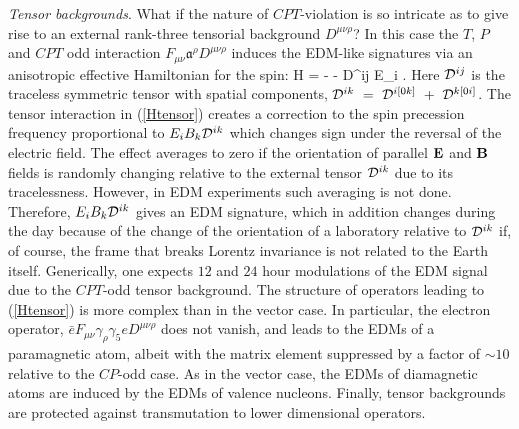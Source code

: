 \documentclass[prl,twocolumn,tightenlines,preprintnumbers,floatfix,nofootinbib]{revtex4}
\def\ba{\begin{eqnarray}}
\def\ea{\end{eqnarray}}
\begin{document}
{\em Tensor backgrounds}. What if the nature of $CPT$-violation is so intricate as to give rise to
an external rank-three tensorial background $D^{\mu\nu\rho}$?
 In this case the $T$, $P$ and $CPT$ odd interaction  
$F_{\mu\nu} \mathfrak{a}^{\rho}D^{\mu\nu\rho}$
induces the EDM-like signatures via an anisotropic effective Hamiltonian for the spin:
\be
H = -  \cdot {} - {\cal D}^{ij} E_i \cdot {}.
\label{Htensor}
\ee
Here ${\cal D}^{ij}$ is the traceless symmetric tensor with spatial components,
${\cal D}^{ik} ~=~ {\cal D}^{i[0k]} ~+~ {\cal D}^{k[0i]}$. The tensor interaction in (\ref{Htensor})
creates a correction to the spin precession frequency proportional to 
$E_iB_k{\cal D}^{ik}$ which changes sign under the reversal of the electric field. 
The effect averages to zero if the orientation of 
parallel ${\bf E}$ and ${\bf B}$ fields is randomly changing relative to the 
external tensor  ${\cal D}^{ik}$ due to its tracelessness. However, in EDM experiments
such averaging is not done. Therefore, $E_iB_k{\cal D}^{ik}$ gives an EDM 
signature, which in addition changes during the day because of the change of the 
orientation of a laboratory relative to ${\cal D}^{ik}$ if, of course, the frame that breaks 
Lorentz invariance is not related to the Earth itself. Generically, 
one expects $12$ and $24$ hour modulations of the EDM signal due to 
the $CPT$-odd tensor background. 
The structure of operators leading to (\ref{Htensor})
 is more complex than in the vector case. 
In particular, the electron operator, $\bar e  F_{\mu\nu}\gamma_\rho\gamma_5   e D^{\mu\nu\rho}$ 
does not vanish, and leads to the EDMs of a paramagnetic atom, albeit with the matrix element suppressed
by a factor of $\sim 10$ relative to the $CP$-odd case.  As in the vector case, 
the EDMs of diamagnetic atoms are induced by the 
EDMs of valence nucleons. Finally, tensor backgrounds are protected against transmutation 
to lower dimensional operators. 
\end{document}

